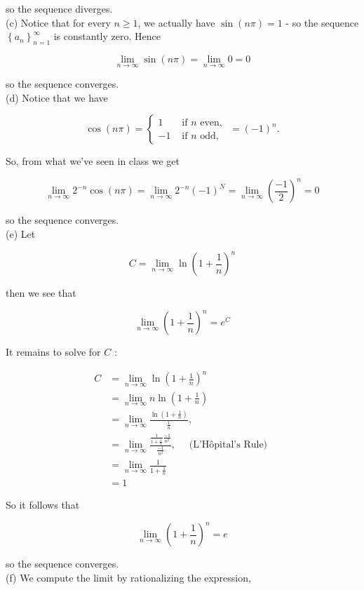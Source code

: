 \documentclass[10pt]{article}
\begin{document}
so the sequence diverges.\\
(c) Notice that for every $n \geq 1$, we actually have $\sin (n \pi)=1$ - so the sequence $\left\{a_{n}\right\}_{n=1}^{\infty}$ is constantly zero. Hence

$$
\lim _{n \rightarrow \infty} \sin (n \pi)=\lim _{n \rightarrow \infty} 0=0
$$

so the sequence converges.\\
(d) Notice that we have

$$
\cos (n \pi)=\left\{\begin{array}{ll}
1 & \text { if } n \text { even, } \\
-1 & \text { if } n \text { odd, }
\end{array}=(-1)^{n} .\right.
$$

So, from what we've seen in class we get

$$
\lim _{n \rightarrow \infty} 2^{-n} \cos (n \pi)=\lim _{n \rightarrow \infty} 2^{-n}(-1)^{N}=\lim _{n \rightarrow \infty}\left(\frac{-1}{2}\right)^{n}=0
$$

so the sequence converges.\\
(e) Let

$$
C=\lim _{n \rightarrow \infty} \ln \left(1+\frac{1}{n}\right)^{n}
$$

then we see that

$$
\lim _{n \rightarrow \infty}\left(1+\frac{1}{n}\right)^{n}=e^{C}
$$

It remains to solve for $C$ :

$$
\begin{aligned}
C & =\lim _{n \rightarrow \infty} \ln \left(1+\frac{1}{n}\right)^{n} \\
& =\lim _{n \rightarrow \infty} n \ln \left(1+\frac{1}{n}\right) \\
& =\lim _{n \rightarrow \infty} \frac{\ln \left(1+\frac{1}{n}\right)}{\frac{1}{n}}, \\
& =\lim _{n \rightarrow \infty} \frac{\frac{1}{1+\frac{1}{n}} \frac{-1}{n^{2}}}{\frac{-1}{n^{2}}}, \quad \text { (L'Hôpital's Rule) } \\
& =\lim _{n \rightarrow \infty} \frac{1}{1+\frac{1}{n}} \\
& =1
\end{aligned}
$$

So it follows that

$$
\lim _{n \rightarrow \infty}\left(1+\frac{1}{n}\right)^{n}=e
$$

so the sequence converges.\\
(f) We compute the limit by rationalizing the expression,
\end{document}
